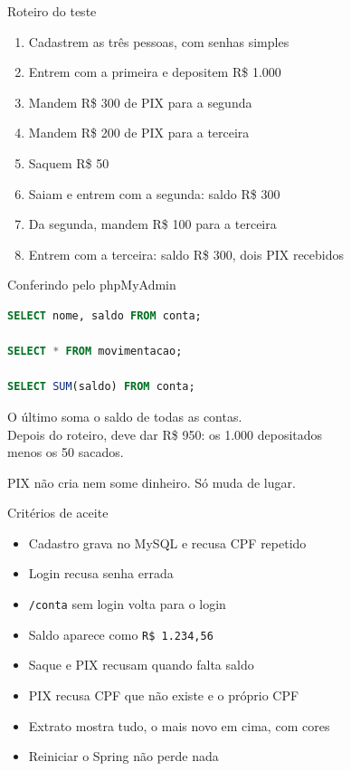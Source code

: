\documentclass[aspectratio=169,11pt]{beamer}
\begin{document}
\begin{frame}{Roteiro do teste}
  \begin{enumerate}
    \item Cadastrem as três pessoas, com senhas simples
    \item Entrem com a primeira e depositem R\$ 1.000
    \item Mandem R\$ 300 de PIX para a segunda
    \item Mandem R\$ 200 de PIX para a terceira
    \item Saquem R\$ 50
    \item Saiam e entrem com a segunda: saldo R\$ 300
    \item Da segunda, mandem R\$ 100 para a terceira
    \item Entrem com a terceira: saldo R\$ 300, dois PIX recebidos
  \end{enumerate}

\end{frame}

\begin{frame}[fragile]{Conferindo pelo phpMyAdmin}
\begin{lstlisting}[language=SQL,basicstyle=\ttfamily\footnotesize]
SELECT nome, saldo FROM conta;

SELECT * FROM movimentacao;

SELECT SUM(saldo) FROM conta;
\end{lstlisting}

  \vspace{0.4em}
  O último soma o saldo de todas as contas.\\
  Depois do roteiro, deve dar R\$ 950: os 1.000 depositados\\
  menos os 50 sacados.

  \vspace{0.4em}
  PIX não cria nem some dinheiro. Só muda de lugar.
\end{frame}

\begin{frame}{Critérios de aceite}
  \begin{itemize}
    \item [ ] Cadastro grava no MySQL e recusa CPF repetido
    \item [ ] Login recusa senha errada
    \item [ ] \texttt{/conta} sem login volta para o login
    \item [ ] Saldo aparece como \texttt{R\$ 1.234,56}
    \item [ ] Saque e PIX recusam quando falta saldo
    \item [ ] PIX recusa CPF que não existe e o próprio CPF
    \item [ ] Extrato mostra tudo, o mais novo em cima, com cores
    \item [ ] Reiniciar o Spring não perde nada
  \end{itemize}
\end{frame}
\end{document}
